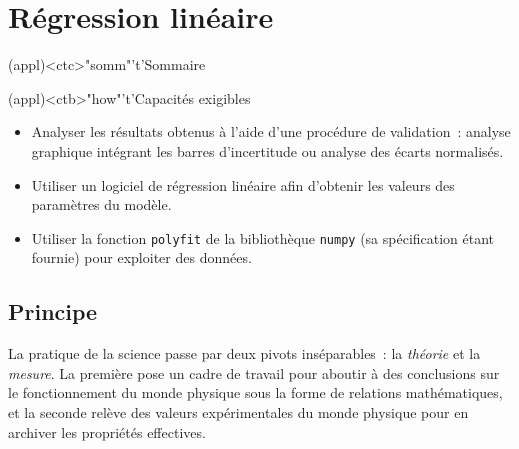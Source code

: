 \documentclass[a4paper, 12pt, garamond]{book}
\begin{document}
\setcounter{chapter}{2}


\chapter{Régression linéaire}

\vspace*{\fill}

\begin{tcn}(appl)<ctc>"somm"'t'{Sommaire}
	\let\item\olditem
	\vspace{-15pt}
	\minitoc
	\vspace{-25pt}
\end{tcn}

\begin{tcn}(appl)<ctb>"how"'t'{Capacités exigibles}
	\begin{itemize}[label=\rcheck]
    \item Analyser les résultats obtenus à l'aide d'une procédure de
          validation~: analyse graphique intégrant les barres d'incertitude ou
          analyse des écarts normalisés.
    \item Utiliser un logiciel de régression linéaire afin d'obtenir les
          valeurs des paramètres du modèle.
    \item Utiliser la fonction \texttt{polyfit} de la bibliothèque
          \texttt{numpy} (sa spécification étant fournie) pour exploiter des
          données.
	\end{itemize}
\end{tcn}

\vspace*{\fill}
\newpage

\section{Principe}

La pratique de la science passe par deux pivots inséparables~: la
\textit{théorie} et la \textit{mesure}. La première pose un cadre de travail
pour aboutir à des conclusions sur le fonctionnement du monde physique sous la
forme de relations mathématiques, et la seconde relève des valeurs
expérimentales du monde physique pour en archiver les propriétés effectives.
\end{document}
